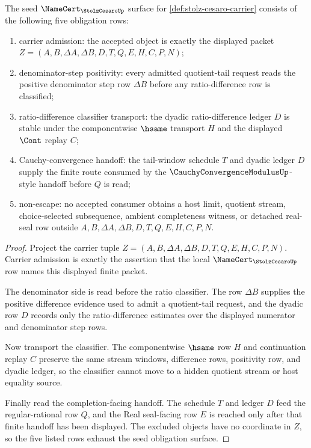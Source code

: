 \begin{theorem}
\label{thm:stolz-cesaro-namecert-obligation-sketch}
The seed $\NameCert_{\StolzCesaroUp}$ surface for \autoref{def:stolz-cesaro-carrier} consists of the following five obligation rows:
\begin{enumerate}
\item carrier admission: the accepted object is exactly the displayed packet $Z=(A,B,\Delta A,\Delta B,D,T,Q,E,H,C,P,N)$;
\item denominator-step positivity: every admitted quotient-tail request reads the positive denominator step row $\Delta B$ before any ratio-difference row is classified;
\item ratio-difference classifier transport: the dyadic ratio-difference ledger $D$ is stable under the componentwise $\hsame$ transport $H$ and the displayed $\Cont$ replay $C$;
\item Cauchy-convergence handoff: the tail-window schedule $T$ and dyadic ledger $D$ supply the finite route consumed by the $\CauchyConvergenceModulusUp$-style handoff before $Q$ is read;
\item non-escape: no accepted consumer obtains a host limit, quotient stream, choice-selected subsequence, ambient completeness witness, or detached real-seal row outside $A,B,\Delta A,\Delta B,D,T,Q,E,H,C,P,N$.
\end{enumerate}
\end{theorem}
\begin{proof}
Project the carrier tuple $Z=(A,B,\Delta A,\Delta B,D,T,Q,E,H,C,P,N)$. Carrier admission is exactly the assertion that the local $\NameCert_{\StolzCesaroUp}$ row names this displayed finite packet.

The denominator side is read before the ratio classifier. The row $\Delta B$ supplies the positive difference evidence used to admit a quotient-tail request, and the dyadic row $D$ records only the ratio-difference estimates over the displayed numerator and denominator step rows.

Now transport the classifier. The componentwise $\hsame$ row $H$ and continuation replay $C$ preserve the same stream windows, difference rows, positivity row, and dyadic ledger, so the classifier cannot move to a hidden quotient stream or host equality source.

Finally read the completion-facing handoff. The schedule $T$ and ledger $D$ feed the regular-rational row $Q$, and the Real seal-facing row $E$ is reached only after that finite handoff has been displayed. The excluded objects have no coordinate in $Z$, so the five listed rows exhaust the seed obligation surface.
\end{proof}

